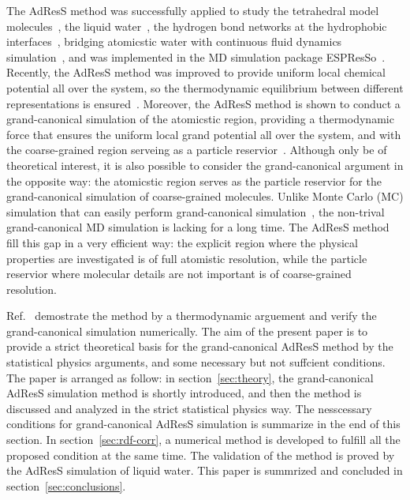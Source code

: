 \documentclass[aps,pre,preprint,unsortedaddress]{revtex4}
\begin{document}
The AdResS method was successfully applied to study the tetrahedral
model molecules~\cite{praprotnik2006adaptive}, the liquid
water~\cite{matysiak2008modeling}, the hydrogen bond networks at the
hydrophobic interfaces~\cite{lambeth2010communication}, bridging
atomicstic water with continuous fluid dynamics
simulation~\cite{delgado2009coupling}, and was implemented in the MD
simulation package ESPResSo~\cite{junghans2010reference,
  limbach2006espresso}. Recently, the AdResS method was improved to
provide uniform local chemical potential all over the system, so the
thermodynamic equilibrium between different representations is
ensured~\cite{poblete2010coupling}.  Moreover, the AdResS method is
shown to conduct a grand-canonical simulation of the atomicstic
region, providing a thermodynamic force that ensures the uniform local
grand potential all over the system, and with the coarse-grained
region serveing as a particle reservior~\cite{fritsch2011grand}.
Although only be of theoretical interest, it is also possible to
consider the grand-canonical argument in the opposite way: the
atomicstic region serves as the particle reservior for the
grand-canonical simulation of coarse-grained molecules.
Unlike Monte Carlo (MC) simulation that can easily perform
grand-canonical simulation~\cite{allen1990computer}, the non-trival
grand-canonical MD simulation is lacking for a long time. The AdResS
method fill this gap in a very efficient way: the explicit region
where the physical properties are investigated is of full atomistic
resolution, while the particle reservior where molecular details are
not important is of coarse-grained resolution.

Ref.~\cite{fritsch2011grand} demostrate the method by a thermodynamic
arguement and verify the grand-canonical simulation numerically.  The
aim of the present paper is to provide a strict theoretical basis for
the grand-canonical AdResS method by the statistical physics
arguments, and some necessary but not suffcient conditions.  The paper
is arranged as follow: in section~\ref{sec:theory}, the
grand-canonical AdResS simulation method is shortly introduced, and
then the method is discussed and analyzed in the strict statistical
physics way. The nesscessary conditions for grand-canonical AdResS
simulation is summarize in the end of this section. In
section~\ref{sec:rdf-corr}, a numerical method is developed to fulfill
all the proposed condition at the same time. The validation of the
method is proved by the AdResS simulation of liquid water.  This paper
is summrized and concluded in section~\ref{sec:conclusions}.
\end{document}
